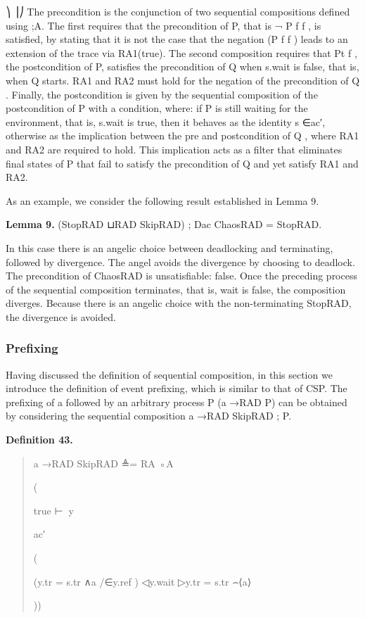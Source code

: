 \documentclass[11pt]{article}
\begin{document}
⎞ ⎟⎠ The precondition is the conjunction of two sequential compositions defined using ;A. The first requires that the precondition of P, that is ¬ P f f , is satisfied, by stating that it is not the case that the negation (P f f ) leads to an extension of the trace via RA1(true). The second composition requires that Pt f , the postcondition of P, satisfies the precondition of Q when s.wait is false, that is, when Q starts. RA1 and RA2 must hold for the negation of the precondition of Q . Finally, the postcondition is given by the sequential composition of the postcondition of P with a condition, where: if P is still waiting for the environment, that is, s.wait is true, then it behaves as the identity s ∈ac′, otherwise as the implication between the pre and postcondition of Q , where RA1 and RA2 are required to hold. This implication acts as a filter that eliminates final states of P that fail to satisfy the precondition of Q and yet satisfy RA1 and RA2.

As an example, we consider the following result established in Lemma 9.

\noindent\textbf{Lemma 9.} (StopRAD ⊔RAD SkipRAD) ; Dac ChaosRAD = StopRAD.


In this case there is an angelic choice between deadlocking and terminating, followed by divergence. The angel avoids the divergence by choosing to deadlock. The precondition of ChaosRAD is unsatisfiable: false. Once the preceding process of the sequential composition terminates, that is, wait is false, the composition diverges. Because there is an angelic choice with the non-terminating StopRAD, the divergence is avoided.

\subsubsection{Prefixing}
Having discussed the definition of sequential composition, in this section we introduce the definition of event prefixing, which is similar to that of CSP. The prefixing of a followed by an arbitrary process P (a →RAD P) can be obtained by considering the sequential composition a →RAD SkipRAD ; P.

\noindent\textbf{Definition 43.}


\begin{quote}\small\raggedright
a →RAD SkipRAD ≜= RA ◦A
\par
(
\par
true ⊢∈⃝y
\par
ac′
\par
(
\par
(y.tr = s.tr ∧a /∈y.ref ) ◁y.wait ▷y.tr = s.tr ⌢⟨a⟩
\par
))
\end{quote}
\end{document}
